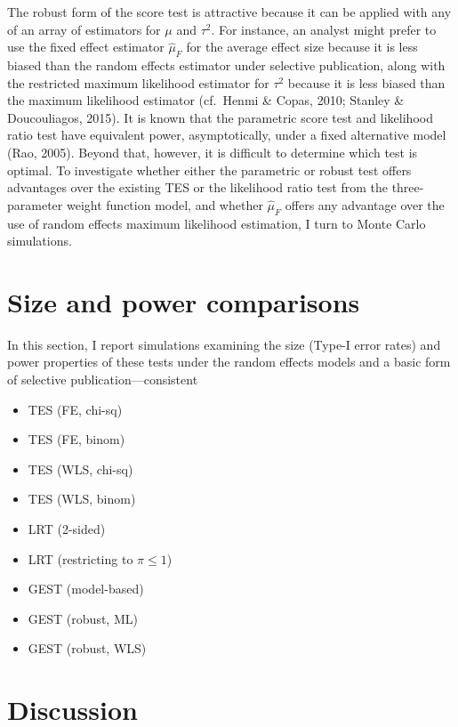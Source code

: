 \documentclass[man,floatsintext]{apa6}
\providecommand{\tightlist}{%
  \setlength{\itemsep}{0pt}\setlength{\parskip}{0pt}}
\begin{document}
The robust form of the score test is attractive because it can be applied with any of an array of estimators for \(\mu\) and \(\tau^2\).
For instance, an analyst might prefer to use the fixed effect estimator \(\hat\mu_F\) for the average effect size because it is less biased than the random effects estimator under selective publication, along with the restricted maximum likelihood estimator for \(\tau^2\) because it is less biased than the maximum likelihood estimator (cf.~Henmi \& Copas, 2010; Stanley \& Doucouliagos, 2015).
It is known that the parametric score test and likelihood ratio test have equivalent power, asymptotically, under a fixed alternative model (Rao, 2005).
Beyond that, however, it is difficult to determine which test is optimal.
To investigate whether either the parametric or robust test offers advantages over the existing TES or the likelihood ratio test from the three-parameter weight function model, and whether \(\hat\mu_F\) offers any advantage over the use of random effects maximum likelihood estimation, I turn to Monte Carlo simulations.

\hypertarget{simulations}{%
\section{Size and power comparisons}\label{simulations}}

In this section, I report simulations examining the size (Type-I error rates) and power properties of these tests under the random effects models and a basic form of selective publication---consistent

\begin{itemize}
\tightlist
\item
  TES (FE, chi-sq)
\item
  TES (FE, binom)
\item
  TES (WLS, chi-sq)
\item
  TES (WLS, binom)
\item
  LRT (2-sided)
\item
  LRT (restricting to \(\pi \leq 1\))
\item
  GEST (model-based)
\item
  GEST (robust, ML)
\item
  GEST (robust, WLS)
\end{itemize}

\hypertarget{discussion}{%
\section{Discussion}\label{discussion}}
\end{document}
